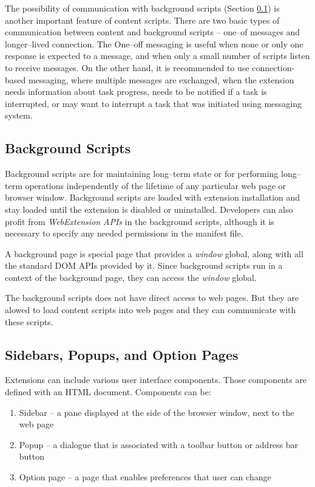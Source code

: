 The possibility of communication with background scripts (Section \ref{text:backgroundScripts}) is another important feature of content scripts. There are two basic types of communication between content and background scripts -- one--of messages and longer--lived connection. The One--off messaging is useful when none or only one response is expected to a message, and when only a small number of scripts listen to receive messages. On the other hand, it is recommended to use connection-based messaging, where multiple messages are exchanged, when the extension needs information about task progress, needs to be notified if a task is interrupted, or may want to interrupt a task that was initiated using messaging system.

\subsection{Background Scripts}
\label{text:backgroundScripts}
Background scripts are for maintaining long--term state or for performing long--term operations independently of the lifetime of any particular web page or browser window. Background scripts are loaded with extension installation and stay loaded until the extension is disabled or uninstalled. Developers can also profit from \textit{WebExtension APIs} in the background scripts, although it is necessary to specify any needed permissions in the manifest file.

A background page is special page that provides a \textit{window} global, along with all the standard DOM APIs provided by it. Since background scripts run in a context of the background page, they can access the \textit{window} global.

The background scripts does not have direct access to web pages. But they are alowed to load content scripts into web pages and they can communicate with these scripts.

\subsection{Sidebars, Popups, and Option Pages}
Extensions can include various user interface components. Those components are defined with an HTML document. Components can be:
\begin{enumerate}
    \item Sidebar -- a pane displayed at the side of the browser window, next to the web page
    \item Popup -- a dialogue that is associated with a toolbar button or address bar button
    \item Option page -- a page that enables preferences that user can change
\end{enumerate}


